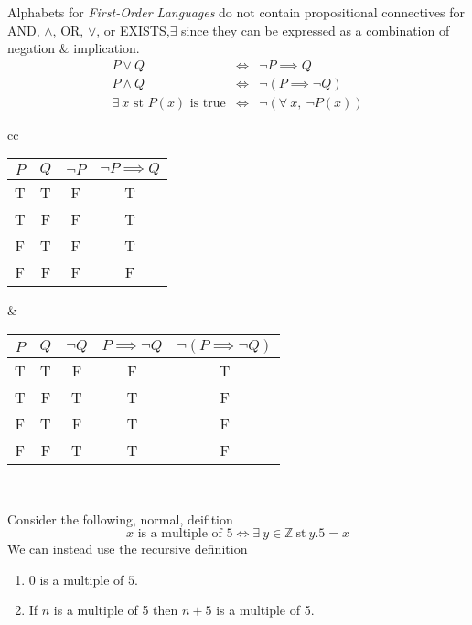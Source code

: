 \documentclass[11pt,a4paper]{article}
\begin{document}
Alphabets for \textit{First-Order Languages} do not contain propositional connectives for AND, $\wedge$, OR, $\vee$, or EXISTS,$\exists$ since they can be expressed as a combination of negation \& implication.
\[\begin{array}{rcl}
P\vee Q&\Longleftrightarrow& \neg P\implies Q\\P\wedge Q&\Longleftrightarrow&\neg(P\implies\neg Q)\\
\exists\ x\text{ st }P(x)\text{ is true}&\Longleftrightarrow&\neg(\forall\ x,\ \neg P(x))
\end{array}\]
\begin{center}
\begin{tabular}{cc}
\begin{tabular}{cc|c|c}
$P$&$Q$&$\neg P$&$\neg P\implies Q$\\\hline
T&T&F&T\\
T&F&F&T\\
F&T&F&T\\
F&F&F&F
\end{tabular}&
\begin{tabular}{cc|c|c|c}
$P$&$Q$&$\neg Q$&$P\implies\neg Q$&$\neg(P\implies\neg Q)$\\\hline
T&T&F&F&T\\
T&F&T&T&F\\
F&T&F&T&F\\
F&F&T&T&F
\end{tabular}
\end{tabular}\\
\end{center}

Consider the following, normal, deifition
$$x\text{ is a multiple of }5\Longleftrightarrow\exists\ y\in\mathbb{Z}\ \text{st}\ y.5=x$$
We can instead use the recursive definition
\begin{enumerate}
	\item $0$ is a multiple of $5$.
	\item If $n$ is a multiple of 5 then $n+5$ is a multiple of 5.
\end{enumerate}
\end{document}
